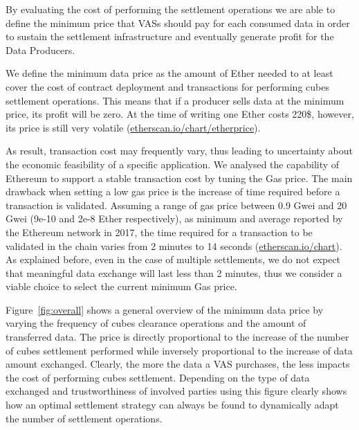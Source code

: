 By evaluating the cost of performing the settlement operations we are able to define the minimum price that VASs should pay for each consumed data in order to sustain the settlement infrastructure and eventually generate profit for the Data Producers.

We define the minimum data price as the amount of Ether needed to at least cover the cost of contract deployment and transactions for performing cubes settlement operations. This means that if a producer sells data at the minimum price, its profit will be zero. 
At the time of writing one Ether costs 220\$, however, its price is still very volatile (\url{etherscan.io/chart/etherprice}).

As result, transaction cost may frequently vary, thus leading to uncertainty about the economic feasibility of a specific application. We analysed the capability of Ethereum to support a stable transaction cost by tuning the Gas price. The main drawback when setting a low gas price is the increase of time required before a transaction is validated. Assuming a range of gas price between 0.9 Gwei and 20 Gwei (9e-10 and 2e-8 Ether respectively), as minimum and average reported by the Ethereum network in 2017, the time required for a transaction to be validated in the chain varies from 2 minutes to 14 seconds (\url{etherscan.io/chart}). As explained before, even in the case of multiple settlements, we do not expect that meaningful data exchange will last less than 2 minutes, thus we consider a viable choice to select the current minimum Gas price.


Figure~\ref{fig:overall} shows a general overview of the minimum data price by varying the frequency of cubes clearance operations and the amount of transferred data. The price is directly proportional to the increase of the number of cubes settlement performed while inversely proportional to the increase of data amount exchanged. Clearly, the more the data a VAS purchases, the less impacts the cost of performing cubes settlement. Depending on the type of data exchanged and trustworthiness of involved parties using this figure clearly shows how an optimal settlement strategy can always be found to dynamically adapt the number of settlement operations.

